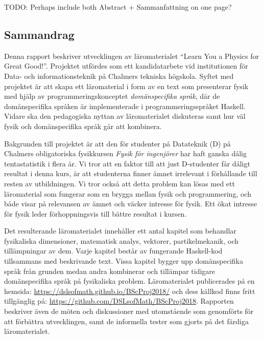 
\thispagestyle{plain}			%

TODO: Perhaps include both Abstract + Sammanfattning on one page?

\begin{binge}

\section*{Sammandrag}

Denna rapport beskriver utvecklingen av läromaterialet ``Learn You a
Physics for Great Good!''. Projektet utfördes som ett kandidatarbete vid institutionen
för Data- och informationsteknik på Chalmers tekniska högskola. Syftet
med projektet är att skapa ett läromaterial i form av en text som
presenterar fysik med hjälp av programmeringskonceptet
\textit{domänspecifika språk}, där de domänspecifika språken är
implementerade i programmeringsspråket Haskell. Vidare ska 
den pedagogiska nyttan av läromaterialet diskuteras samt hur väl fysik och
domänspecifika språk går att kombinera.

Bakgrunden till projektet är att den för studenter på Datateknik (D) på
Chalmers obligatoriska fysikkursen \textit{Fysik för ingenjörer} har
haft ganska dålig tentastatistik i flera år. Vi tror att en
faktor till att just D-studenter får dåligt resultat i denna
kurs, är att studenterna finner ämnet irrelevant i förhållande till
resten av utbildningen. Vi tror också att detta problem kan lösas med ett
läromaterial som fungerar som en brygga mellan fysik och
programmering, och både visar på relevansen av ämnet och väcker
intresse för fysik. Ett ökat intresse för fysik leder förhoppningsvis
till bättre resultat i kursen.

Det resulterande läromaterialet innehåller ett antal kapitel som
behandlar fysikaliska dimensioner, matematisk analys,
vektorer, partikelmekanik, och tillämpningar av dem. Varje kapitel
består av fungerande Haskell-kod tillsammans med beskrivande
text. Vissa kapitel bygger upp domänspecifika språk från grunden medan
andra kombinerar och tillämpar tidigare domänspecifika språk på
fysikaliska problem. Läromaterialet publicerades på en hemsida:
\url{https://dslsofmath.github.io/BScProj2018/} och dess källkod finns
fritt tillgänglig på:
\url{https://github.com/DSLsofMath/BScProj2018}. Rapporten beskriver
även de möten och diskussioner med utomstående som genomförts för att
förbättra utvecklingen, samt de informella tester som gjorts på det
färdiga läromaterialet.


\end{binge}
